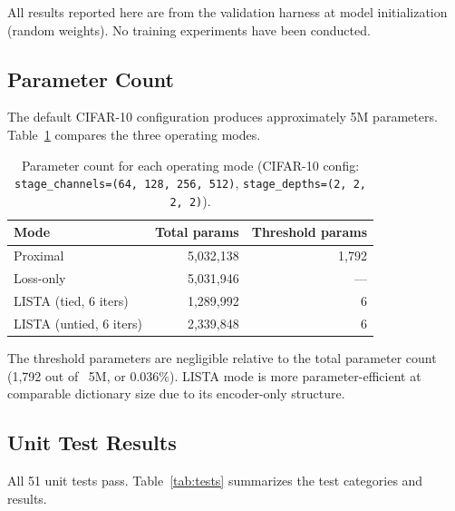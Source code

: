 \documentclass{article}
\begin{document}
All results reported here are from the validation harness at model
initialization (random weights). No training experiments have been conducted.

\subsection{Parameter Count}

The default CIFAR-10 configuration produces approximately 5M parameters.
Table~\ref{tab:params} compares the three operating modes.

\begin{table}[h]
\centering
\caption{Parameter count for each operating mode (CIFAR-10 config:
         \texttt{stage\_channels=(64, 128, 256, 512)},
         \texttt{stage\_depths=(2, 2, 2, 2)}).}\label{tab:params}
\begin{tabular}{lrr}
\toprule
Mode & Total params & Threshold params \\
\midrule
Proximal    & 5,032,138 & 1,792 \\
Loss-only   & 5,031,946 & ---   \\
LISTA (tied, 6 iters) & 1,289,992 & 6 \\
LISTA (untied, 6 iters) & 2,339,848 & 6 \\
\bottomrule
\end{tabular}
\end{table}

The threshold parameters are negligible relative to the total parameter count
(1,792 out of ~5M, or $0.036\%$). LISTA mode is more parameter-efficient at
comparable dictionary size due to its encoder-only structure.

\subsection{Unit Test Results}

All 51 unit tests pass. Table~\ref{tab:tests} summarizes the test categories
and results.
\end{document}
